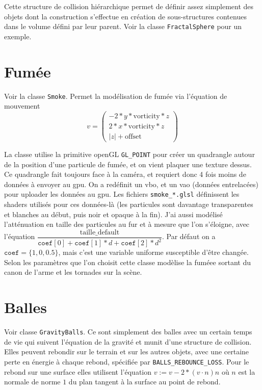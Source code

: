 \documentclass[10pt, a4paper]{article}
\theoremstyle{definition}
\begin{document}
\bigbreak

Cette structure de collision hiérarchique permet de définir assez simplement des objets dont la construction s'effectue en création de sous-structures contenues dans le volume défini par leur parent. Voir la classe \texttt{FractalSphere} pour un exemple.

\section{Fumée}
Voir la classe \texttt{Smoke}. Permet la modélisation de fumée via l'équation de mouvement
$$ v = \begin{pmatrix}
-2 * y * \textrm{vorticity} *z \\ 2 * x * \textrm{vorticity} *z \\ |z| + \textrm{offset}
\end{pmatrix}
$$

La classe utilise la primitive openGL \texttt{GL\_POINT} pour créer un quadrangle autour de la position d'une particule de fumée, et on vient plaquer une texture dessus. Ce quadrangle fait toujours face à la caméra, et requiert donc 4 fois moins de données à envoyer au gpu. On a redéfinit un vbo, et un vao (données entrelacées) pour uploader les données au gpu. Les fichiers \texttt{smoke\_*.glsl} définissent les shaders utilisés pour ces données-là (les particules sont davantage transparentes et blanches au début, puis noir et opaque à la fin). J'ai aussi modélisé l'atténuation en taille des particules au fur et à mesure que l'on s'éloigne, avec l'équation $\dfrac{\textrm{taille\_default}}{\texttt{coef}[0] + \texttt{coef}[1] * d + \texttt{coef}[2] *d^2}$. Par défaut on a $\texttt{coef} = \{1,0,0.5\}$, mais c'est une variable uniforme susceptible d'être changée.
\smallbreak
Selon les paramètres que l'on choisit cette classe modèlise la fuméee sortant du canon de l'arme et les tornades sur la scène.


\section{Balles}
Voir classe \texttt{GravityBalls}. Ce sont simplement des balles avec un certain temps de vie qui suivent l'équation de la gravité et munit d'une structure de collision. Elles peuvent rebondir sur le terrain et sur les autres objets, avec une certaine perte en énergie à chaque rebond, spécifiée par \texttt{BALLS\_REBOUNCE\_LOSS}. Pour le rebond sur une surface elles utilisent l'équation $v := v - 2 * (v\cdot n)n$ où $n$ est la normale de norme $1$ du plan tangent à la surface au point de rebond.
\end{document}
